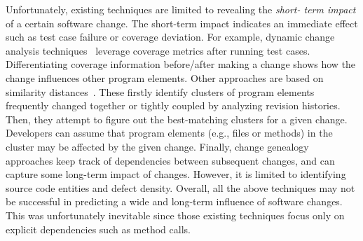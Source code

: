 \vspace{0.15in}
Unfortunately, existing techniques are limited to revealing the \emph{short-
term impact} of a certain software change. The short-term impact indicates an
immediate effect such as test case failure or coverage deviation. For example,
dynamic change analysis
techniques~\cite{ren_chianti:_2004,zhang_faulttracer:_2012} leverage coverage
metrics after running test cases. Differentiating coverage information
before/after making a change shows how the change influences other program
elements. Other approaches are based on similarity distances~\cite{robillard_retrieving_2008,sherriff_empirical_2008}.
 These
firstly identify clusters of program elements frequently changed
together or tightly coupled by analyzing revision histories. Then, they
attempt to figure out the best-matching clusters for a given change.
Developers can assume that program elements (e.g., files or methods) in the
cluster may be affected by the given change. Finally, change genealogy~\cite{herzig_capturing_2010,herzig_mining_2011,herzig_predicting_2013} 
approaches keep track of dependencies between subsequent changes, and can capture some long-term impact of changes.
However, it is limited to identifying source code entities and defect density. Overall, all  the above
techniques may not be successful in predicting a wide and long-term influence
of software changes. This was unfortunately inevitable since those existing
techniques focus only on explicit dependencies such as method calls.

